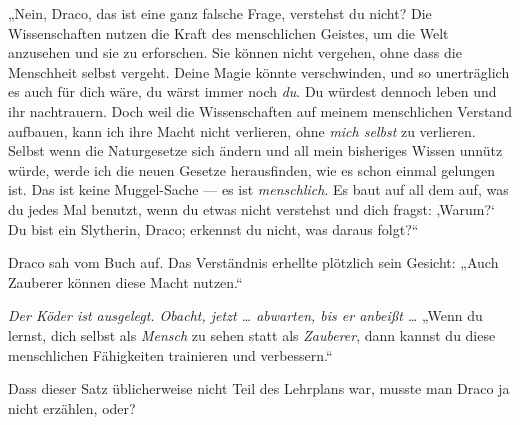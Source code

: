 „Nein, Draco, das ist eine ganz falsche Frage, verstehst du nicht? Die Wissenschaften nutzen die Kraft des menschlichen Geistes, um die Welt anzusehen und sie zu erforschen. Sie können nicht vergehen, ohne dass die Menschheit selbst vergeht. Deine Magie könnte verschwinden, und so unerträglich es auch für dich wäre, du wärst immer noch \emph{du}. Du würdest dennoch leben und ihr nachtrauern. Doch weil die Wissenschaften auf meinem menschlichen Verstand aufbauen, kann ich ihre Macht nicht verlieren, ohne \emph{mich selbst} zu verlieren. Selbst wenn die Naturgesetze sich ändern und all mein bisheriges Wissen unnütz würde, werde ich die neuen Gesetze herausfinden, wie es schon einmal gelungen ist. Das ist keine Muggel-Sache — es ist \emph{menschlich}. Es baut auf all dem auf, was du jedes Mal benutzt, wenn du etwas nicht verstehst und dich fragst: ‚Warum?‘ Du bist ein Slytherin, Draco; erkennst du nicht, was daraus folgt?“

Draco sah vom Buch auf. Das Verständnis erhellte plötzlich sein Gesicht:
„Auch Zauberer können diese Macht nutzen.“

\emph{Der Köder ist ausgelegt. Obacht, jetzt … abwarten, bis er anbeißt …}
„Wenn du lernst, dich selbst als \emph{Mensch} zu sehen statt als \emph{Zauberer}, dann kannst du diese menschlichen Fähigkeiten trainieren und verbessern.“

Dass dieser Satz üblicherweise nicht Teil des Lehrplans war, musste man Draco ja nicht erzählen, oder?

